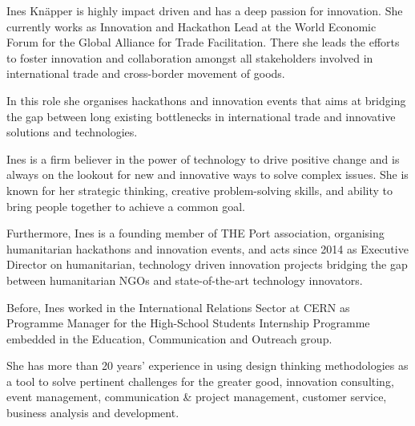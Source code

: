 \documentclass{ieeeaccess}
\begin{document}
\begin{IEEEbiography}
{Ines Knäpper} is highly impact driven and has a deep passion for innovation. She currently works as Innovation and Hackathon Lead at the World Economic Forum for the Global Alliance for Trade Facilitation. There she leads the efforts to foster innovation and collaboration amongst all stakeholders involved in international trade and cross-border movement of goods.

In this role she organises hackathons and innovation events that aims at bridging the gap between long existing bottlenecks in international trade and innovative solutions and technologies.

Ines is a firm believer in the power of technology to drive positive change and is always on the lookout for new and innovative ways to solve complex issues. She is known for her strategic thinking, creative problem-solving skills, and ability to bring people together to achieve a common goal.

Furthermore, Ines is a founding member of THE Port association, organising humanitarian hackathons and innovation events, and acts since 2014 as Executive Director on humanitarian, technology driven innovation projects bridging the gap between humanitarian NGOs and state-of-the-art technology innovators.

Before, Ines worked in the International Relations Sector at CERN as Programme Manager for the High-School Students Internship Programme embedded in the Education, Communication and Outreach group.

She has more than 20 years’ experience in using design thinking methodologies as a tool to solve pertinent challenges for the greater good, innovation consulting, event management, communication \& project management, customer service, business analysis and development. 
\end{IEEEbiography}
\end{document}
